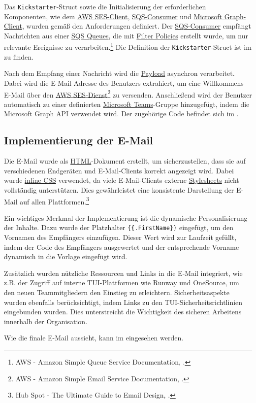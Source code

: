 Das \texttt{Kickstarter}-Struct sowie die Initialisierung der erforderlichen Komponenten, wie dem \hyperlink{AWSSESClient}{\textcolor{AOBlau}{AWS SES-Client}}, \hyperlink{SQSConsumer}{\textcolor{AOBlau}{SQS-Consumer}} und \hyperlink{GraphClient}{\textcolor{AOBlau}{Microsoft Graph-Client}}, wurden gemäß den Anforderungen definiert. Der \hyperlink{SQSConsumer}{\textcolor{AOBlau}{SQS-Consumer}} empfängt Nachrichten aus einer \hyperlink{SQS}{\textcolor{AOBlau}{SQS Queues}}, die mit \hyperlink{FilterPolicies}{\textcolor{AOBlau}{Filter Policies}} erstellt wurde, um nur relevante Ereignisse zu verarbeiten.\footnote{AWS - Amazon Simple Queue Service Documentation, \cite{aws2023sqs}.} Die Definition der \texttt{Kickstarter}-Struct ist im  zu finden.

Nach dem Empfang einer Nachricht wird die \hyperlink{Payload}{\textcolor{AOBlau}{Payload}} asynchron verarbeitet. Dabei wird die E-Mail-Adresse des Benutzers extrahiert, um eine Willkommens-E-Mail über den \hyperlink{AWSSESClient}{\textcolor{AOBlau}{AWS SES-Dienst}}\footnote{AWS - Amazon Simple Email Service Documentation, \cite{aws2023ses}.} zu versenden. Anschließend wird der Benutzer automatisch zu einer definierten \hyperlink{MicrosoftTeams}{\textcolor{AOBlau}{Microsoft Teams}}-Gruppe hinzugefügt, indem die \hyperlink{MicrosoftGraphAPI}{\textcolor{AOBlau}{Microsoft Graph API}} verwendet wird.
Der zugehörige Code befindet sich im .

\subsection{Implementierung der E-Mail}
\label{sec:ImplementierungGeschaeftslogik}

Die E-Mail wurde als \hyperlink{HTML}{\textcolor{AOBlau}{HTML}}-Dokument erstellt, um sicherzustellen, dass sie auf verschiedenen Endgeräten und E-Mail-Clients korrekt angezeigt wird. Dabei wurde \hyperlink{CSS}{\textcolor{AOBlau}{inline CSS}} verwendet, da viele E-Mail-Clients externe \hyperlink{CSS}{\textcolor{AOBlau}{Stylesheets}} nicht vollständig unterstützen. Dies gewährleistet eine konsistente Darstellung der E-Mail auf allen Plattformen.\footnote{Hub Spot - The Ultimate Guide to Email Design, \cite{HubSpot}.}

Ein wichtiges Merkmal der Implementierung ist die dynamische Personalisierung der Inhalte. Dazu wurde der Platzhalter \texttt{\{\{.FirstName\}\}} eingefügt, um den Vornamen des Empfängers einzufügen. Dieser Wert wird zur Laufzeit gefüllt, indem der Code des Empfängers ausgewertet und der entsprechende Vorname dynamisch in die Vorlage eingefügt wird.

Zusätzlich wurden nützliche Ressourcen und Links in die E-Mail integriert, wie z.B. der Zugriff auf interne TUI-Plattformen wie  \hyperlink{Runway}{\textcolor{AOBlau}{Runway}} und \hyperlink{OneSource}{\textcolor{AOBlau}{OneSource}}, um den neuen Teammitgliedern den Einstieg zu erleichtern. Sicherheitsaspekte wurden ebenfalls berücksichtigt, indem Links zu den TUI-Sicherheitsrichtlinien eingebunden wurden. Dies unterstreicht die Wichtigkeit des sicheren Arbeitens innerhalb der Organisation.

Wie die finale E-Mail aussieht, kann im  eingesehen werden.
